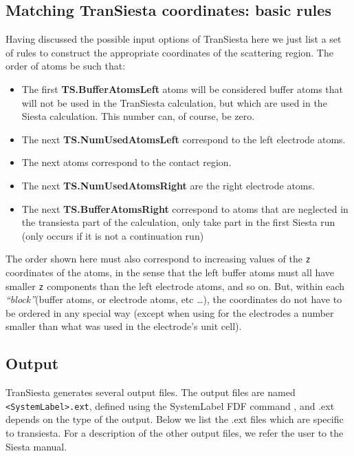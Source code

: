 \documentclass[11pt]{article}
\begin{document}
\subsection{  Matching   {\sc TranSiesta} coordinates: basic rules}
Having discussed the possible input options of {\sc TranSiesta} here
we just list a set of rules to construct the appropriate coordinates
of the scattering region.  The order of atoms be such that:
\begin{itemize}
\item
The first {\bf TS.BufferAtomsLeft} atoms will be considered buffer
atoms that will not be used in the {\sc TranSiesta} calculation, but
which are used in the {\sc Siesta} calculation. This number can, of
course, be zero.
\item The next {\bf TS.NumUsedAtomsLeft} correspond to the left
  electrode atoms.

\item  The next atoms correspond to the contact region.
\item  The next {\bf TS.NumUsedAtomsRight} are the right electrode atoms.
\item The next {\bf TS.BufferAtomsRight} correspond to atoms that are
  neglected in the transiesta part of the calculation, only take part
  in the first {\sc Siesta} run (only occurs if it is not a
  continuation run)
\end{itemize}

The order shown here must also correspond to increasing values of the
{\tt z} coordinates of the atoms, in the sense that the left buffer
atoms must all have smaller {\tt z} components than the left electrode
atoms, and so on. But, within each {\it ``block''}(buffer atoms, or
electrode atoms, etc \ldots), the coordinates do not have to be
ordered in any special way (except when using for the electrodes a
number smaller than what was used in the electrode's unit cell).

\subsection{Output}

{\sc TranSiesta} generates several output files.  The output files are
named {\tt <SystemLabel>.ext}, defined using the SystemLabel FDF
command , and .ext depends on the type of the output.  Below we list
the .ext files which are specific to transiesta.  For a description of
the other output files, we refer the user to the {\sc Siesta} manual.
\end{document}
